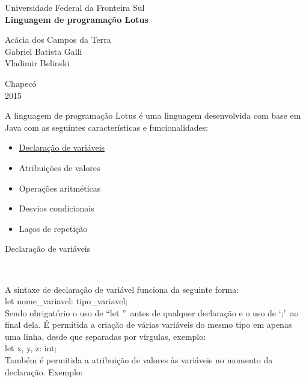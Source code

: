 \documentclass[12pt,a4paper]{article}
\begin{document}
\begin{titlepage}
\begin{center}
{\large Universidade Federal da Fronteira Sul}\\[5.5cm]
{\bf \huge Linguagem de programação Lotus}\\[4.9cm]
\end{center}
{\large Acácia dos Campos da Terra}\\
{\large Gabriel Batista Galli}\\
{\large Vladimir Belinski}\\[5.8cm]
\begin{center}
{\large Chapecó}\\[0.1cm]
{\large 2015}
\end{center}
\end{titlepage}

A linguagem de programação Lotus é uma linguagem desenvolvida com base em Java com as seguintes características e funcionalidades:\\

\begin{itemize}
\item \hyperlink{label}{Declaração de variáveis}
\item Atribuições de valores
\item Operações aritméticas
\item Desvios condicionais
\item Laços de repetição\\[15.4cm]
\end{itemize}

\hypertarget{label}{\Large{Declaração de variáveis}}\\[0.3cm]
\normalsize

A sintaxe de declaração de variável funciona da seguinte forma:\\

let nome\_variavel: tipo\_variavel;\\

Sendo obrigatório o uso de ``let ''\ antes de qualquer declaração e o uso de `;'\ ao final dela. É permitida a criação de várias variáveis do mesmo tipo em apenas uma linha, desde que separadas por vírgulas, exemplo:\\

let x, y, z: int;\\

Também é permitida a atribuição de valores às variáveis no momento da declaração. Exemplo:\\
\end{document}
